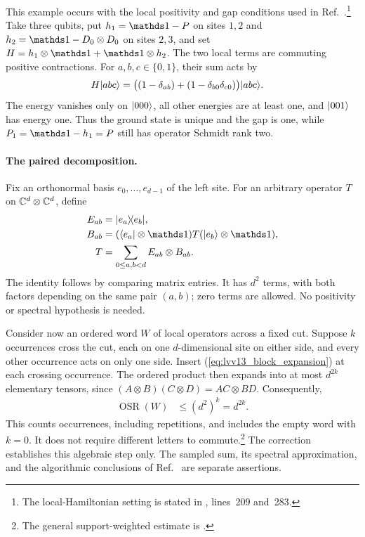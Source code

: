\documentclass{article}
\begin{document}
This example occurs with the local positivity and gap conditions used in
Ref.~\cite{Landau2013PolynomialTime}.\footnote{The local-Hamiltonian
setting is stated in , lines~209 and~283.}
Take three qubits, put $h_1=\Id-P$ on sites $1,2$ and
$h_2=\Id-D_0\otimes D_0$ on sites $2,3$, and set
$H=h_1\otimes\Id+\Id\otimes h_2$. The two local terms are commuting
positive contractions. For $a,b,c\in\{0,1\}$, their sum acts by
\begin{align}
    H|abc\rangle
      &=\bigl((1-\delta_{ab})+(1-\delta_{b0}\delta_{c0})\bigr)|abc\rangle.
    \label{eq:lvv13_three_site_spectrum}
\end{align}
The energy vanishes only on $|000\rangle$, all other energies are at least
one, and $|001\rangle$ has energy one. Thus the ground state is unique and
the gap is one, while $P_1=\Id-h_1=P$ still has operator Schmidt rank two.

\paragraph{The paired decomposition.}
Fix an orthonormal basis $e_0,\ldots,e_{d-1}$ of the left site. For an arbitrary
operator $T$ on $\mathbb{C}^d\otimes\mathbb{C}^d$, define
\begin{align}
    E_{ab}&=\ketbra{e_a}{e_b},\notag\\
    B_{ab}&=(\bra{e_a}\otimes\Id)T(\ket{e_b}\otimes\Id),\notag\\
    T&=\sum_{0\le a,b<d}E_{ab}\otimes B_{ab}.
    \label{eq:lvv13_block_expansion}
\end{align}
The identity follows by comparing matrix entries. It has $d^2$ terms,
with both factors depending on the same pair $(a,b)$; zero terms are
allowed. No positivity or spectral hypothesis is needed.

Consider now an ordered word $W$ of local operators across a fixed cut.
Suppose $k$ occurrences cross the cut, each on one $d$-dimensional site
on either side, and every other occurrence acts on only one side. Insert
(\ref{eq:lvv13_block_expansion}) at each crossing occurrence.
The ordered product then expands into at most $d^{2k}$ elementary tensors,
since $(A\otimes B)(C\otimes D)=AC\otimes BD$. Consequently,
\begin{align}
    \operatorname{OSR}(W)&\le(d^2)^k=d^{2k}.
    \label{eq:lvv13_word_rank}
\end{align}
This counts occurrences, including repetitions, and includes the empty
word with $k=0$. It does not require different letters to commute.\footnote{The general
support-weighted estimate is
.}
The correction establishes this algebraic step only. The sampled sum,
its spectral approximation, and the algorithmic conclusions of
Ref.~\cite{Landau2013PolynomialTime} are separate assertions.



\end{document}
